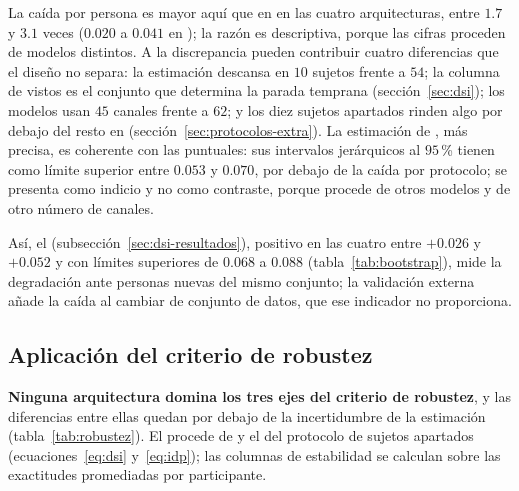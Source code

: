 La caída por persona es mayor aquí que en \loso{} en las cuatro arquitecturas, entre $1.7$ y $3.1$ veces
($0.020$ a $0.041$ en \loso{}); la razón es descriptiva, porque las cifras proceden de modelos distintos. A
la discrepancia pueden contribuir cuatro diferencias que el diseño no separa: la estimación descansa en $10$
sujetos frente a $54$; la columna de vistos es el conjunto que determina la parada temprana
(sección~\ref{sec:dsi}); los modelos usan $45$ canales frente a $62$; y los diez sujetos apartados rinden
algo por debajo del resto en \loso{} (sección~\ref{sec:protocolos-extra}). La estimación de \loso{}, más
precisa, es coherente con las puntuales: sus intervalos jerárquicos al $95$\,\% tienen como límite superior
entre $0.053$ y $0.070$, por debajo de la caída por protocolo; se presenta como indicio y no como contraste,
porque procede de otros modelos y de otro número de canales.

Así, el \dsi{} (subsección~\ref{sec:dsi-resultados}), positivo en las cuatro entre $+0.026$ y $+0.052$ y con
límites superiores de $0.068$ a $0.088$ (tabla~\ref{tab:bootstrap}), mide la degradación ante personas nuevas del mismo conjunto; la validación
externa añade la caída al cambiar de conjunto de datos, que ese indicador no proporciona.

\subsection{Aplicación del criterio de robustez}
\label{sec:aplicacion-robustez}

\textbf{Ninguna arquitectura domina los tres ejes del criterio de robustez}, y las diferencias entre ellas
quedan por debajo de la incertidumbre de la estimación (tabla~\ref{tab:robustez}). El \dsi{} procede de
\loso{} y el \idp{} del protocolo de sujetos apartados (ecuaciones~\eqref{eq:dsi} y~\eqref{eq:idp});
las columnas de estabilidad se calculan sobre las exactitudes \loso{} promediadas por participante.

